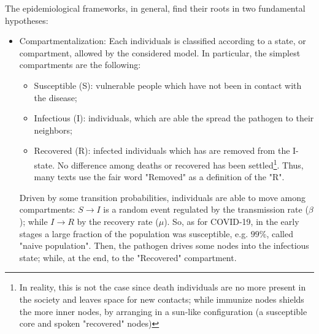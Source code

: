 \documentclass[a4paper,12pt,twoside]{book} %
\theoremstyle{definition}
\begin{document}
The epidemiological frameworks, in general, find their roots in two fundamental hypotheses:
\begin{itemize}
	\item Compartmentalization: Each individuals is classified according to a state, or compartment, allowed by the considered model. In particular, the simplest compartments are the following:
	\begin{itemize}
		\item Susceptible (S): vulnerable people which have not been in contact with the disease;
		\item Infectious (I): individuals, which are able the spread the pathogen to their neighbors;
		\item Recovered (R): infected individuals which has are removed from the I-state. No difference among deaths or recovered has been settled\footnote{In reality, this is not the case since death individuals are no more present in the society and leaves space for new contacts; while immunize nodes shields the more inner nodes, by arranging in a sun-like configuration (a susceptible core and spoken "recovered" nodes)}. Thus, many texts use the fair word "Removed" as a definition of the "R".
	\end{itemize}
	
	Driven by some transition probabilities, individuals are able to move among compartments: $S \rightarrow I$ is a random event regulated by the transmission rate ($\beta$); while $I \rightarrow R$ by the recovery rate ($\mu$). So, as for COVID-19, in the early stages a large fraction of the population was susceptible, e.g. $99\%$, called "naive population". Then, the pathogen drives some nodes into the infectious state; while, at the end, to the "Recovered" compartment.


\end{itemize}
\end{document}
